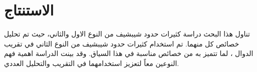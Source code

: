 \chapter*{الاستنتاج}

تناول هذا البحث دراسة كثيرات حدود شيبشيف من النوع الاول والثاني، حيث تم تحليل خصائص كل منهما. تم استخدام كثيرات حدود شيبشيف من النوع الثاني في تقريب الدوال ، لما تتميز به من خصائص مناسبة في هذا السياق. وقد بينت الدراسة اهمية فهم النوعين معاً لتعزيز استخدامهما في التقريب والتحليل العددي.